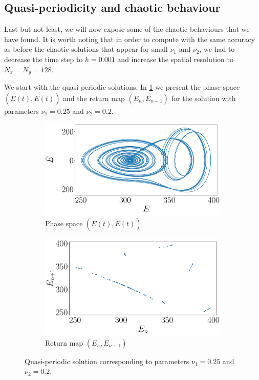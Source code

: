 \documentclass[twoside]{article}
\begin{document}
\subsection{Quasi-periodicity and chaotic behaviour}\label{sec:chaotic}
Last but not least, we will now expose some of the chaotic behaviours that we have found. It is worth noting that in order to compute with the same accuracy as before the chaotic solutions that appear for small $\nu_1$ and $\nu_2$, we had to decrease the time step to $h=0.001$ and increase the spatial resolution to $N_x=N_y=128$.

We start with the quasi-periodic solutions. In \cref{fig:qp} we present the phase space $(E(t), \dot{E}(t))$ and the return map $(E_n,E_{n+1})$ for the solution with parameters $\nu_1=0.25$ and $\nu_2=0.2$.

\begin{figure}[ht]
  \centering
  \begin{subfigure}[ht]{0.45\textwidth}
    \includegraphics[width=\textwidth]{images/qp_phase.pdf}
    \caption{Phase space $(E(t), \dot{E}(t))$}
  \end{subfigure}\hspace{0.033333\textwidth}
  \begin{subfigure}[ht]{0.45\textwidth}
    \includegraphics[width=\textwidth]{images/qp_return.pdf}
    \caption{Return map $(E_n,E_{n+1})$}
  \end{subfigure}
  \caption{Quasi-periodic solution corresponding to parameters $\nu_1=0.25$ and $\nu_2=0.2$.}
  \label{fig:qp}
\end{figure}
\end{document}
